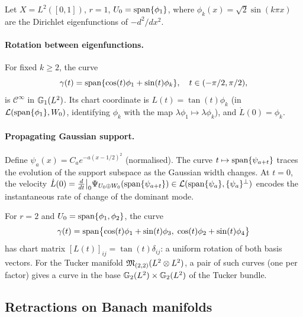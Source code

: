 \begin{example}
\label{ex:grassmann_curves}
Let $X = L^2([0,1])$, $r=1$, $U_0 = \mathrm{span}\{\phi_1\}$, where
$\phi_k(x) = \sqrt{2}\sin(k\pi x)$ are the Dirichlet eigenfunctions of
$-d^2/dx^2$.

\paragraph{Rotation between eigenfunctions.}
For fixed $k \geq 2$, the curve
\begin{equation*}
    \gamma(t) = \mathrm{span}\{\cos(t)\phi_1 + \sin(t)\phi_k\},
    \quad t \in (-\pi/2, \pi/2),
\end{equation*}
is $\mathcal{C}^\infty$ in $\mathbb{G}_{1}(L^2)$. Its chart coordinate is
$L(t) = \tan(t)\phi_k$ (in $\mathcal{L}(\mathrm{span}\{\phi_1\}, W_0)$, identifying
$\phi_k$ with the map $\lambda\phi_1 \mapsto \lambda\phi_k$), and
$\dot L(0) = \phi_k$.

\paragraph{Propagating Gaussian support.}
Define $\psi_a(x) = C_a e^{-a(x-1/2)^2}$ (normalised). The curve
$t \mapsto \mathrm{span}\{\psi_{a+t}\}$ traces the evolution of the support
subspace as the Gaussian width changes. At $t=0$, the velocity
$\dot L(0) = \frac{d}{dt}\big|_0 \Psi_{U_0\oplus W_0}(\mathrm{span}\{\psi_{a+t}\})
\in \mathcal{L}(\mathrm{span}\{\psi_a\}, \{\psi_a\}^\perp)$ encodes the instantaneous
rate of change of the dominant mode.
\end{example}

\begin{example}[Curves in $\Grass{r}{L^2}$ for $r=2$]
\label{ex:grassmann_curves_r}
For $r=2$ and $U_0 = \mathrm{span}\{\phi_1,\phi_2\}$, the curve
\begin{equation*}
    \gamma(t) = \mathrm{span}\bigl\{
    \cos(t)\phi_1 + \sin(t)\phi_3,\;
    \cos(t)\phi_2 + \sin(t)\phi_4
    \bigr\}
\end{equation*}
has chart matrix $[L(t)]_{ij} = \tan(t)\delta_{ij}$: a uniform
rotation of both basis vectors. For the Tucker manifold
$\mathfrak{M}_{(2,2)}(L^2 \otimes L^2)$, a pair of such curves (one per
factor) gives a curve in the base $\mathbb{G}_{2}(L^2) \times \mathbb{G}_{2}(L^2)$
of the Tucker bundle.
\end{example}

\subsection*{Retractions on Banach manifolds}

